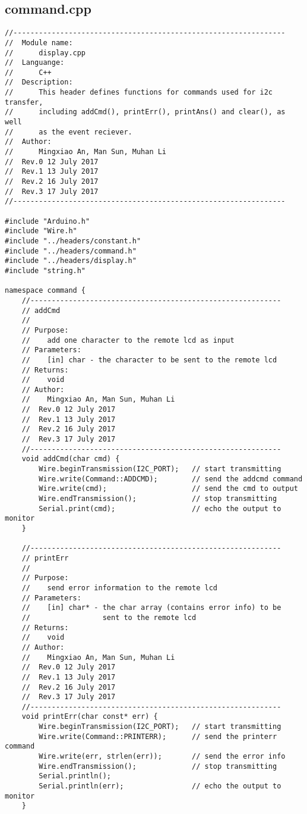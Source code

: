 \subsection{command.cpp}
\begin{verbatim}
//----------------------------------------------------------------
//  Module name:
//      display.cpp
//  Languange:
//      C++
//  Description:
//      This header defines functions for commands used for i2c transfer,
//      including addCmd(), printErr(), printAns() and clear(), as well
//      as the event reciever.
//  Author:
//      Mingxiao An, Man Sun, Muhan Li
//  Rev.0 12 July 2017
//  Rev.1 13 July 2017
//  Rev.2 16 July 2017
//  Rev.3 17 July 2017
//----------------------------------------------------------------

#include "Arduino.h"
#include "Wire.h"
#include "../headers/constant.h"
#include "../headers/command.h"
#include "../headers/display.h"
#include "string.h"

namespace command {
    //-----------------------------------------------------------  
    // addCmd 
    //  
    // Purpose:  
    //    add one character to the remote lcd as input   
    // Parameters:  
    //    [in] char - the character to be sent to the remote lcd
    // Returns:  
    //    void  
    // Author:  
    //    Mingxiao An, Man Sun, Muhan Li
    //  Rev.0 12 July 2017
    //  Rev.1 13 July 2017
    //  Rev.2 16 July 2017
    //  Rev.3 17 July 2017
    //----------------------------------------------------------- 
    void addCmd(char cmd) {
        Wire.beginTransmission(I2C_PORT);   // start transmitting
        Wire.write(Command::ADDCMD);        // send the addcmd command
        Wire.write(cmd);                    // send the cmd to output
        Wire.endTransmission();             // stop transmitting
        Serial.print(cmd);                  // echo the output to monitor
    }

    //-----------------------------------------------------------  
    // printErr 
    //
    // Purpose:  
    //    send error information to the remote lcd
    // Parameters:  
    //    [in] char* - the char array (contains error info) to be 
    //                 sent to the remote lcd
    // Returns:  
    //    void  
    // Author:  
    //    Mingxiao An, Man Sun, Muhan Li
    //  Rev.0 12 July 2017
    //  Rev.1 13 July 2017
    //  Rev.2 16 July 2017
    //  Rev.3 17 July 2017
    //----------------------------------------------------------- 
    void printErr(char const* err) {
        Wire.beginTransmission(I2C_PORT);   // start transmitting
        Wire.write(Command::PRINTERR);      // send the printerr command
        Wire.write(err, strlen(err));       // send the error info
        Wire.endTransmission();             // stop transmitting
        Serial.println();
        Serial.println(err);                // echo the output to monitor
    }
    

\end{verbatim}
